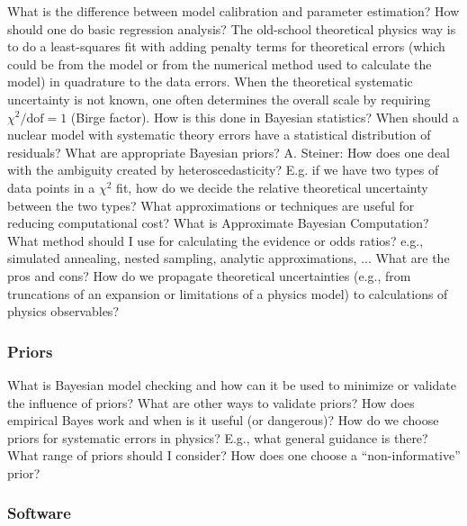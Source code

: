   \bi
    \I What is the difference between model calibration and
      parameter estimation?
    \I How should one do basic regression analysis?
    \bi
      \I The old-school theoretical physics way is to do a
	least-squares fit with adding penalty terms for
	theoretical errors (which could be from the model or
	from the numerical method used to calculate the model)
	in quadrature to the data errors.
      \I When the theoretical systematic uncertainty is not
	known, one often determines the overall scale by
	requiring \( \chi^2/\mathrm{dof} = 1 \)
	(Birge factor). How is this done in
	Bayesian statistics?
      \I When should a nuclear model with systematic theory
	errors have a statistical distribution of residuals?
      \I What are appropriate Bayesian priors?
      \I A. Steiner: How does one deal with the
	ambiguity created by heteroscedasticity? E.g.
	if we have two types of data points in a
	\( \chi^2 \) fit, how do we decide the
	relative theoretical uncertainty between
	the two types?
    \ei
    \I What approximations or techniques are useful for
      reducing computational cost?
    \I What is Approximate Bayesian Computation?
    \I What method should I use for calculating the evidence
      or odds ratios?
    \bi
      \I e.g., simulated annealing, nested sampling, analytic
	approximations, ...
      \I What are the pros and cons?
    \ei
    \I How do we propagate theoretical uncertainties (e.g.,
      from truncations of an expansion or limitations of a physics
      model) to calculations of physics observables?
  \ei
  
  \subsubsection{Priors}

  \bi
    \I What is Bayesian model checking and how can it be used
      to minimize or validate the influence of priors?
    \I What are other ways to validate priors?
    \I How does empirical Bayes work and when is it useful
      (or dangerous)?
    \I How do we choose priors for systematic errors in
      physics?
    \bi
      \I E.g., what general guidance is there?
      \I What range of priors should I consider?
      \I How does one choose a ``non-informative'' prior?
    \ei
  \ei
  
  \subsubsection{Software}

